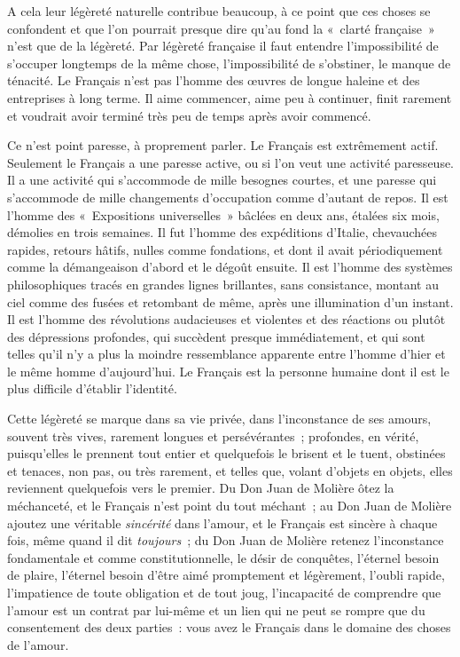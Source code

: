 \documentclass[french,twoside]{book} %
\begin{document}
\noindent A cela leur légèreté naturelle contribue beaucoup, à ce point que ces choses se confondent et que l’on pourrait presque dire qu’au fond la « clarté française » n’est que de la légèreté. Par légèreté française il faut entendre l’impossibilité de s’occuper longtemps de la même chose, l’impossibilité  de s’obstiner, le manque de ténacité. Le Français n’est pas l’homme des œuvres de longue haleine et des entreprises à long terme. Il aime commencer, aime peu à continuer, finit rarement et voudrait avoir terminé très peu de temps après avoir commencé.\par
Ce n’est point paresse, à proprement parler. Le Français est extrêmement actif. Seulement le Français a une paresse active, ou si l’on veut une activité paresseuse. Il a une activité qui s’accommode de mille besognes courtes, et une paresse qui s’accommode de mille changements d’occupation comme d’autant de repos. Il est l’homme des « Expositions universelles » bâclées en deux ans, étalées six mois, démolies en trois semaines. Il fut l’homme des expéditions d’Italie, chevauchées rapides, retours hâtifs, nulles comme fondations, et dont il avait périodiquement comme la démangeaison d’abord et le dégoût ensuite. Il est l’homme des systèmes philosophiques tracés en grandes lignes brillantes, sans consistance, montant au ciel comme des fusées et retombant de même, après une illumination d’un instant. Il est l’homme des révolutions audacieuses et violentes et des réactions ou plutôt des dépressions profondes, qui succèdent presque immédiatement, et qui sont telles qu’il n’y a plus la moindre ressemblance apparente entre  l’homme d’hier et le même homme d’aujourd’hui. Le Français est la personne humaine dont il est le plus difficile d’établir l’identité.\par
Cette légèreté se marque dans sa vie privée, dans l’inconstance de ses amours, souvent très vives, rarement longues et persévérantes ; profondes, en vérité, puisqu’elles le prennent tout entier et quelquefois le brisent et le tuent, obstinées et tenaces, non pas, ou très rarement, et telles que, volant d’objets en objets, elles reviennent quelquefois vers le premier. Du Don Juan de Molière ôtez la méchanceté, et le Français n’est point du tout méchant ; au Don Juan de Molière ajoutez une véritable {\itshape sincérité} dans l’amour, et le Français est sincère à chaque fois, même quand il dit {\itshape toujours} ; du Don Juan de Molière retenez l’inconstance fondamentale et comme constitutionnelle, le désir de conquêtes, l’éternel besoin de plaire, l’éternel besoin d’être aimé promptement et légèrement, l’oubli rapide, l’impatience de toute obligation et de tout joug, l’incapacité de comprendre que l’amour est un contrat par lui-même et un lien qui ne peut se rompre que du consentement des deux parties : vous avez le Français dans le domaine des choses de l’amour.\par
\end{document}
